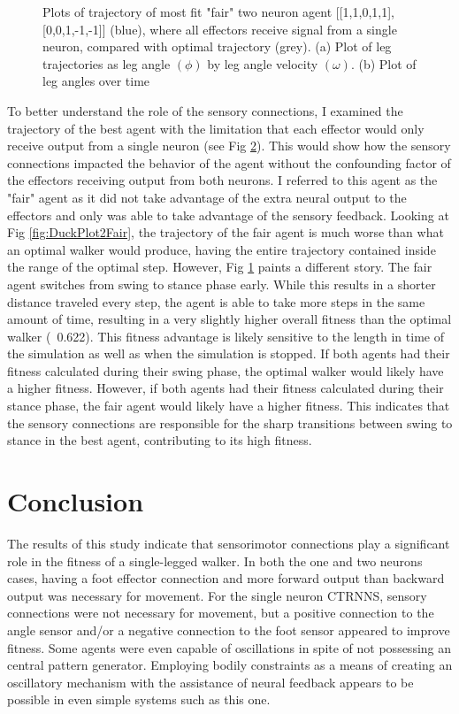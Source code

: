 \documentclass{article}
\begin{document}
\begin{figure}[htbp]
\begin{subfigure}[b]{0.5\textwidth}
    \caption{}
    \label{fig:AngleTimePlot2Fair}
  \end{subfigure}
  \caption{Plots of trajectory of most fit "fair" two neuron agent [[1,1,0,1,1],[0,0,1,-1,-1]] (blue), where all effectors receive signal from a single neuron, compared with optimal trajectory (grey). (a) Plot of leg trajectories as leg angle \((\phi)\) by leg angle velocity \((\omega)\). (b) Plot of leg angles over time}
  \label{fig:plots2Fair}
\end{figure} 

To better understand the role of the sensory connections, I examined the trajectory of the best agent with the limitation that each effector would only receive output from a single neuron (see Fig \ref{fig:plots2Fair}). This would show how the sensory connections impacted the behavior of the agent without the confounding factor of the effectors receiving output from both neurons. I referred to this agent as the "fair" agent as it did not take advantage of the extra neural output to the effectors and only was able to take advantage of the sensory feedback. Looking at Fig \ref{fig:DuckPlot2Fair}, the trajectory of the fair agent is much worse than what an optimal walker would produce, having the entire trajectory contained inside the range of the optimal step. However, Fig \ref{fig:AngleTimePlot2Fair} paints a different story. The fair agent switches from swing to stance phase early. While this results in a shorter distance traveled every step, the agent is able to take more steps in the same amount of time, resulting in a very slightly higher overall fitness than the optimal walker (~0.622). This fitness advantage is likely sensitive to the length in time of the simulation as well as when the simulation is stopped. If both agents had their fitness calculated during their swing phase, the optimal walker would likely have a higher fitness. However, if both agents had their fitness calculated during their stance phase, the fair agent would likely have a higher fitness. This indicates that the sensory connections are responsible for the sharp transitions between swing to stance in the best agent, contributing to its high fitness.

\section{Conclusion}

The results of this study indicate that sensorimotor connections play a significant role in the fitness of a single-legged walker. In both the one and two neurons cases, having a foot effector connection and more forward output than backward output was necessary for movement. For the single neuron CTRNNS, sensory connections were not necessary for movement, but a positive connection to the angle sensor and/or a negative connection to the foot sensor appeared to improve fitness. Some agents were even capable of oscillations in spite of not possessing an central pattern generator. Employing bodily constraints as a means of creating an oscillatory mechanism with the assistance of neural feedback appears to be possible in even simple systems such as this one.
\end{document}

